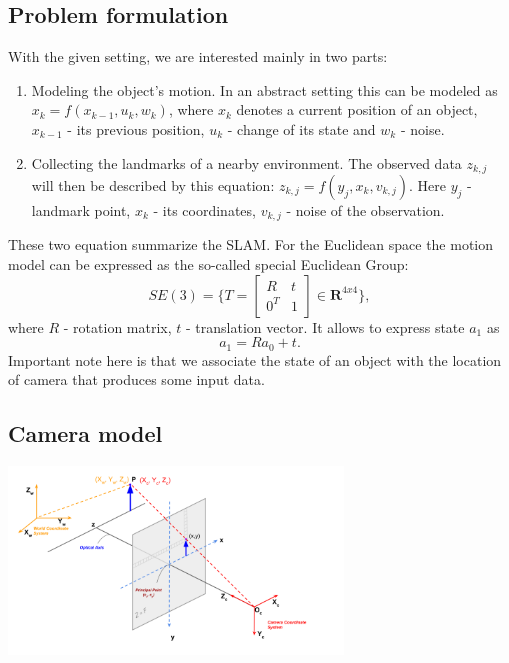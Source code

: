 \subsection{Problem formulation}

With the given setting, we are interested mainly in two parts:
\begin{enumerate}
    \item Modeling the object's motion. In an abstract setting this can be modeled as $x_{k} = f(x_{k - 1}, u_{k}, w_{k})$, where $x_{k}$ denotes a current position of an object, $x_{k - 1}$ - its previous position, $u_{k}$ - change of its state and $w_{k}$ - noise.  
    \item Collecting the landmarks of a nearby environment. The observed data $z_{k, j}$ will then be described by this equation: $z_{k, j} = f(y_{j}, x_{k}, v_{k, j})$. Here $y_{j}$ - landmark point, $x_{k}$ - its coordinates, $v_{k, j}$ - noise of the observation.
\end{enumerate}

These two equation summarize the SLAM. For the Euclidean space the motion model can be expressed as the so-called special Euclidean Group: $$SE(3) = \{ T =
\begin{bmatrix}
    R    &  t      \\
    0^T  &  1      
\end{bmatrix} \in \mathbf{R}^{4x4} \},$$ where $R$ - rotation matrix, $t$ - translation vector. It allows to express state $a_{1}$ as $$a_{1} = R a_{0} + t.$$ Important note here is that we associate the state of an object with the location of camera that produces some input data.

\subsection{Camera model}

\begin{center}
    \includegraphics[height=5cm]{camera_model.png}
\end{center}

